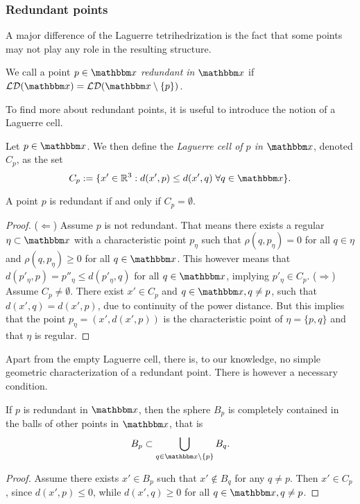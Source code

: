 \subsubsection{Redundant points}

A major difference of the Laguerre tetrihedrization is the fact that some points may not play any role in the resulting structure.

\begin{definition}
	We call a point $p \in \x$ \textit{redundant in} $\x$ if $\mathcal {LD}(\x) = \mathcal {LD}(\x \setminus \{p\})$.
\end{definition}

To find more about redundant points, it is useful to introduce the notion of a Laguerre cell.

\begin{definition}
Let $p\in \x$. We then define the \textit{Laguerre cell of $p$ in $\x$}, denoted $C_p$, as the set
$$C_p := \{x' \in \Rt: d(x',p) \leq d(x',q) \; \forall q \in \x\}.$$ 
\end{definition}

\begin{proposition}
	A point $p$ is redundant if and only if $C_p=\emptyset$.
\end{proposition}
\begin{proof}
	($\Leftarrow$) Assume $p$ is not redundant. That means there exists a regular $\eta\subset \x$ with a characteristic point $p_\eta$ such that $\rho(q,p_\eta)=0$ for all $q\in\eta$ and $\rho(q,p_\eta)\geq 0$ for all $q\in \x$. This however means that $d(p'_\eta,p) = p''_\eta \leq d(p'_\eta,q)$ for all $q\in\x$, implying $p'_\eta \in C_p$. \newline
	($\Rightarrow$) Assume $C_p \neq \emptyset$. There exist $x' \in C_p$ and $q\in\x, q\neq p$, such that $d(x',q)=d(x',p)$, due to continuity of the power distance. But this implies that the point $p_\eta = (x', d(x',p))$ is the characteristic point of $\eta=\{p,q\}$ and that $\eta$ is regular.
\end{proof}

Apart from the empty Laguerre cell, there is, to our knowledge, no simple geometric characterization of a redundant point. There is however a necessary condition.

\begin{proposition}
	If $p$ is redundant in $\x$, then the sphere $B_p$ is completely contained in the balls of other points in $\x$, that is 
	$$B_p \subset \bigcup_{q \in \x\setminus \{p\}} B_q.$$
\end{proposition}
\begin{proof}
	Assume there exists $x' \in B_p$ such that $x' \notin B_q$ for any $q\neq p$. Then $x' \in C_p$, since $d(x', p) \leq 0$, while $d(x',q) \geq 0$ for all $q\in \x, q\neq p$.
\end{proof}


